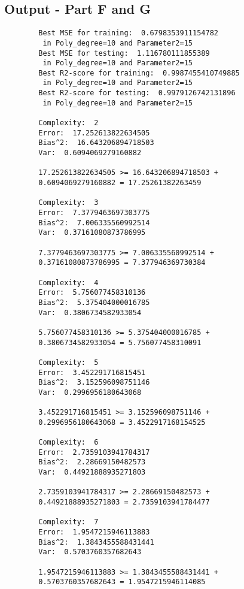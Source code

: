 \subsection{Output - Part F and G}
\label{chap:Output - Part F and G}
\begin{verbatim}
        Best MSE for training:  0.6798353911154782 
         in Poly_degree=10 and Parameter2=15
        Best MSE for testing:  1.116780111855389 
         in Poly_degree=10 and Parameter2=15
        Best R2-score for training:  0.9987455410749885 
         in Poly_degree=10 and Parameter2=15
        Best R2-score for testing:  0.9979126742131896 
         in Poly_degree=10 and Parameter2=15
         
        Complexity:  2
        Error:  17.252613822634505
        Bias^2:  16.643206894718503
        Var:  0.6094069279160882
        
        17.252613822634505 >= 16.643206894718503 +
        0.6094069279160882 = 17.25261382263459
        
        Complexity:  3
        Error:  7.3779463697303775
        Bias^2:  7.006335560992514
        Var:  0.37161080873786995
        
        7.3779463697303775 >= 7.006335560992514 +
        0.37161080873786995 = 7.377946369730384
        
        Complexity:  4
        Error:  5.756077458310136
        Bias^2:  5.375404000016785
        Var:  0.3806734582933054
        
        5.756077458310136 >= 5.375404000016785 +
        0.3806734582933054 = 5.756077458310091
        
        Complexity:  5
        Error:  3.452291716815451
        Bias^2:  3.152596098751146
        Var:  0.2996956180643068
        
        3.452291716815451 >= 3.152596098751146 +
        0.2996956180643068 = 3.4522917168154525
        
        Complexity:  6
        Error:  2.7359103941784317
        Bias^2:  2.28669150482573
        Var:  0.44921888935271803
        
        2.7359103941784317 >= 2.28669150482573 +
        0.44921888935271803 = 2.7359103941784477
        
        Complexity:  7
        Error:  1.9547215946113883
        Bias^2:  1.3843455588431441
        Var:  0.5703760357682643
        
        1.9547215946113883 >= 1.3843455588431441 +
        0.5703760357682643 = 1.9547215946114085
        

\end{verbatim}
